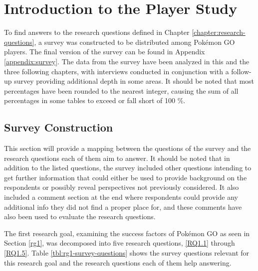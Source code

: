 
\chapter{Introduction to the Player Study}

\label{chapter:player-study-introduction}

To find answers to the research questions defined in Chapter \ref{chapter:research-questions}, a survey was constructed to be distributed among Pokémon GO players. The final version of the survey can be found in Appendix \ref{appendix:survey}. The data from the survey have been analyzed in this and the three following chapters, with interviews conducted in conjunction with a follow-up survey providing additional depth in some areas. It should be noted that most percentages have been rounded to the nearest integer, causing the sum of all percentages in some tables to exceed or fall short of 100 \%.

\section{Survey Construction}

This section will provide a mapping between the questions of the survey and the research questions each of them aim to answer. It should be noted that in addition to the listed questions, the survey included other questions intending to get further information that could either be used to provide background on the respondents or possibly reveal perspectives not previously considered. It also included a comment section at the end where respondents could provide any additional info they did not find a proper place for, and these comments have also been used to evaluate the research questions.

The first research goal, examining the success factors of Pokémon GO as seen in Section \ref{rg1}, was decomposed into five research questions, \ref{RQ1.1} through \ref{RQ1.5}. Table \ref{tbl:rg1-survey-questions} shows the survey questions relevant for this research goal and the research questions each of them help answering.

